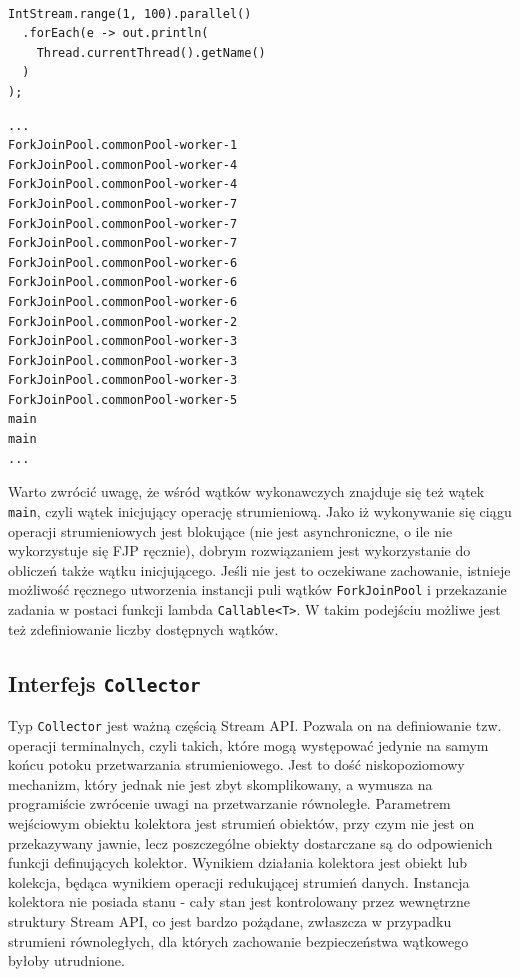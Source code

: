 \documentclass[12pt]{extarticle}
\begin{document}
\begin{lstlisting}[label=streamsthreads, caption=Struktura puli wątków FJP]

IntStream.range(1, 100).parallel()
  .forEach(e -> out.println(
    Thread.currentThread().getName()
  )
);

\end{lstlisting}

\begin{verbatim}
...
ForkJoinPool.commonPool-worker-1
ForkJoinPool.commonPool-worker-4
ForkJoinPool.commonPool-worker-4
ForkJoinPool.commonPool-worker-7
ForkJoinPool.commonPool-worker-7
ForkJoinPool.commonPool-worker-7
ForkJoinPool.commonPool-worker-6
ForkJoinPool.commonPool-worker-6
ForkJoinPool.commonPool-worker-6
ForkJoinPool.commonPool-worker-2
ForkJoinPool.commonPool-worker-3
ForkJoinPool.commonPool-worker-3
ForkJoinPool.commonPool-worker-3
ForkJoinPool.commonPool-worker-5
main
main
...
\end{verbatim}

    Warto zwrócić uwagę, że wśród wątków wykonawczych znajduje się też wątek \texttt{main}, czyli wątek inicjujący operację strumieniową. Jako iż wykonywanie się ciągu operacji strumieniowych jest blokujące (nie jest asynchroniczne, o ile nie wykorzystuje się FJP ręcznie), dobrym rozwiązaniem jest wykorzystanie do obliczeń także wątku inicjującego. Jeśli nie jest to oczekiwane zachowanie, istnieje możliwość ręcznego utworzenia instancji puli wątków \texttt{ForkJoinPool} i przekazanie zadania w postaci funkcji lambda \texttt{Callable<T>}. W takim podejściu możliwe jest też zdefiniowanie liczby dostępnych wątków.


\subsection{Interfejs \texttt{Collector}}

    Typ \texttt{Collector} jest ważną częścią Stream API. Pozwala on na definiowanie tzw. operacji terminalnych, czyli takich, które mogą występować jedynie na samym końcu potoku przetwarzania strumieniowego. Jest to dość niskopoziomowy mechanizm, który jednak nie jest zbyt skomplikowany, a wymusza na programiście zwrócenie uwagi na przetwarzanie równoległe. Parametrem wejściowym obiektu kolektora jest strumień obiektów, przy czym nie jest on przekazywany jawnie, lecz poszczególne obiekty dostarczane są do odpowienich funkcji definujących kolektor. Wynikiem działania kolektora jest obiekt lub kolekcja, będąca wynikiem operacji redukującej strumień danych. Instancja kolektora nie posiada stanu - cały stan jest kontrolowany przez wewnętrzne struktury Stream API, co jest bardzo pożądane, zwłaszcza w przypadku strumieni równoległych, dla których zachowanie bezpieczeństwa wątkowego byłoby utrudnione.
\end{document}
